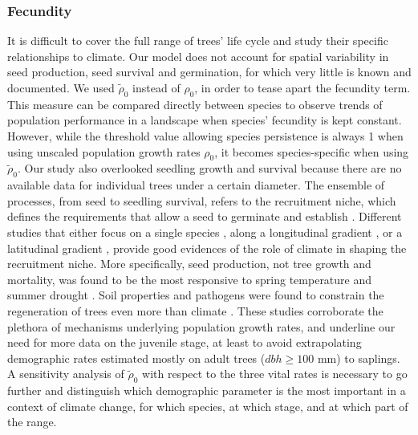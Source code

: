 \subsubsection{Fecundity}
It is difficult to cover the full range of trees' life cycle and study their specific relationships to climate. Our model does not account for spatial variability in seed production, seed survival and germination, for which very little is known and documented. We used $ \tilde \rho_0 $ instead of $ \rho_0 $, in order to tease apart the fecundity term. This measure can be compared directly between species to observe trends of population performance in a landscape when species' fecundity is kept constant. However, while the threshold value allowing species persistence is always 1 when using unscaled population growth rates $ \rho_0 $, it becomes species-specific when using $ \tilde \rho_0 $. Our study also overlooked seedling growth and survival because there are no available data for individual trees under a certain diameter. The ensemble of processes, from seed to seedling survival, refers to the recruitment niche, which defines the requirements that allow a seed to germinate and establish \citep{Valdez2019}. Different studies that either focus on a single species \citep[\textit{Acer saccharum}]{Solarik2016}, along a longitudinal gradient \citep{CLARK2011}, or a latitudinal gradient \citep{Boisvert-Marsh2019}, provide good evidences of the role of climate in shaping the recruitment niche. More specifically, seed production, not tree growth and mortality, was found to be the most responsive to spring temperature and summer drought \citep[11 sites in the Appalachians, Piedmont, and North Carolina]{CLARK2011}. Soil properties and pathogens were found to constrain the regeneration of trees even more than climate \citep[Mont M\'{e}gantic, Qu\'{e}bec]{Brown2014}. These studies corroborate the plethora of mechanisms underlying population growth rates, and underline our need for more data on the juvenile stage, at least to avoid extrapolating demographic rates estimated mostly on adult trees ($ dbh \geqslant 100 $ mm) to saplings. A sensitivity analysis of $ \tilde \rho_0 $ with respect to the three vital rates is necessary to go further and distinguish which demographic parameter is the most important in a context of climate change, for which species, at which stage, and at which part of the range. \\

